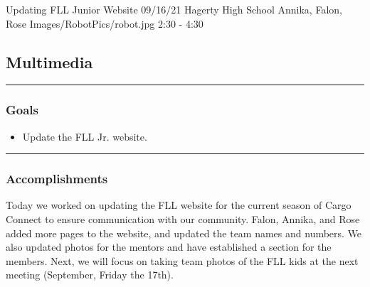 \insertmeeting 
	{Updating FLL Junior Website} 
	{09/16/21}
	{Hagerty High School}
	{Annika, Falon, Rose}
	{Images/RobotPics/robot.jpg}
	{2:30 - 4:30}
	
\subsection*{Multimedia}
\noindent\hfil\rule{\textwidth}{.4pt}\hfil
\subsubsection*{Goals}
\begin{itemize}
    \item Update the FLL Jr. website.

\end{itemize} 

\noindent\hfil\rule{\textwidth}{.4pt}\hfil

\subsubsection*{Accomplishments}
Today we worked on updating the FLL website for the current season of Cargo Connect to ensure communication with our community. Falon, Annika, and Rose added more pages to the website, and updated the team names and numbers. We also updated photos for the mentors and have established a section for the members. Next, we will focus on taking team photos of the FLL kids at the next meeting (September, Friday the 17th).

